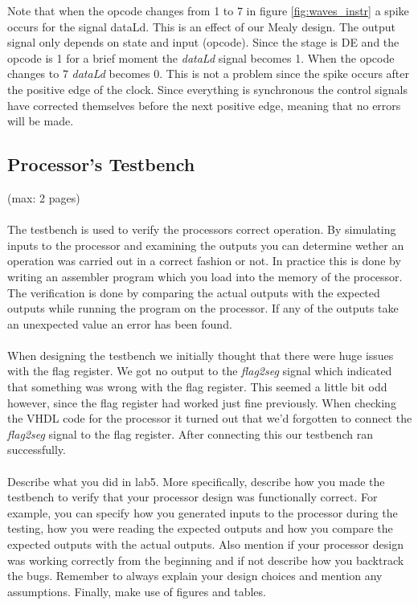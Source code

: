 \documentclass[a4paper,11pt]{article}
\begin{document}
Note that when the opcode changes from 1 to 7 in figure \ref{fig:waves_instr} a spike occurs for the signal dataLd. This is an effect of our Mealy design. The output signal only depends on state and input (opcode). Since the stage is DE and the opcode is 1 for a brief moment the \textit{dataLd} signal becomes 1. When the opcode changes to 7 \textit{dataLd} becomes 0. This is not a problem since the spike occurs after the positive edge of the clock. Since everything is synchronous the control signals have corrected themselves before the next positive edge, meaning that no errors will be made. 

\subsection{Processor's Testbench}
(max: 2 pages)
\\\\
The testbench is used to verify the processors correct operation. By simulating inputs to the processor and examining the outputs you can determine wether an operation was carried out in a correct fashion or not. In practice this is done by writing an assembler program which you load into the memory of the processor. The verification is done by comparing the actual outputs with the expected outputs while running the program on the processor. If any of the outputs take an unexpected value an error has been found.
\\\\
When designing the testbench we initially thought that there were huge issues with the flag register. We got no output to the \textit{flag2seg} signal which indicated that something was wrong with the flag register. This seemed a little bit odd however, since the flag register had worked just fine previously. When checking the VHDL code for the processor it turned out that we'd forgotten to connect the \textit{flag2seg} signal to the flag register. After connecting this our testbench ran successfully. 
\\\\
Describe what you did in lab5. More specifically, describe how you made the testbench to verify that your processor design was functionally correct. For example, you can specify how you generated inputs to the processor during the testing, how you were reading the expected outputs and how you compare the expected outputs with the actual outputs. Also mention if your processor design was working correctly from the beginning and if not describe how you backtrack the bugs. Remember to always explain your design choices and mention any assumptions. Finally, make use of figures and tables. 
\end{document}
